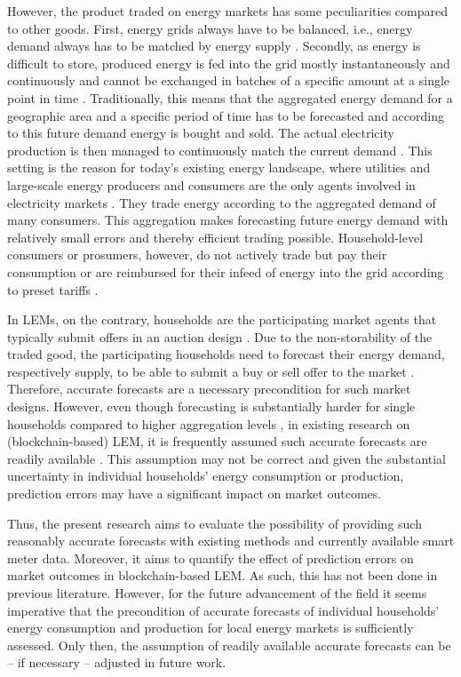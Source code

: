 However, the product traded on energy markets has some peculiarities compared to other goods. First, energy grids always have to be balanced, i.e., energy demand always has to be matched by energy supply \citep{Weron:2006}. Secondly, as energy is difficult to store, produced energy is fed into the grid mostly instantaneously and continuously and cannot be exchanged in batches of a specific amount at a single point in time \citep{Rosen:2013}. Traditionally, this means that the aggregated energy demand for a geographic area and a specific period of time has to be forecasted and according to this future demand energy is bought and sold. The actual electricity production is then managed to continuously match the current demand \citep{Rosen:2013}. This setting is the reason for today’s existing energy landscape, where utilities and large-scale energy producers and consumers are the only agents involved in electricity markets \citep{Weron:2006, Buchmann:2013}. They trade energy according to the aggregated demand of many consumers. This aggregation makes forecasting future energy demand with relatively small errors \citep{Meer:2018, Wang:2018} and thereby efficient trading possible. Household-level consumers or prosumers, however, do not actively trade but pay their consumption or are reimbursed for their infeed of energy into the grid according to preset tariffs \citep{Rosen:2013}. 

In LEMs, on the contrary, households are the participating market agents that typically submit offers in an auction design \citep{Ilic:2012, Lamparter:2010}. Due to the non-storability of the traded good, the participating households need to forecast their energy demand, respectively supply, to be able to submit a buy or sell offer to the market \citep{Rosen:2013}. Therefore, accurate forecasts are a necessary precondition for such market designs. However, even though forecasting is substantially harder for single households compared to higher aggregation levels \citep{Wang:2018}, in existing research on (blockchain-based) LEM, it is frequently assumed such accurate forecasts are readily available \citep{Rosen:2013, Mengelkamp:2018c, Lamparter:2010, Buchmann:2013, Mengelkamp:2018a}. This assumption may not be correct and given the substantial uncertainty in individual households' energy consumption or production, prediction errors may have a significant impact on market outcomes.

Thus, the present research aims to evaluate the possibility of providing such reasonably accurate forecasts with existing methods and currently available smart meter data. Moreover, it aims to quantify the effect of prediction errors on market outcomes in blockchain-based LEM. As such, this has not been done in previous literature. However, for the future advancement of the field it seems imperative that the precondition of accurate forecasts of individual households' energy consumption and production for local energy markets is sufficiently assessed. Only then, the assumption of readily available accurate forecasts can be -- if necessary -- adjusted in future work.

